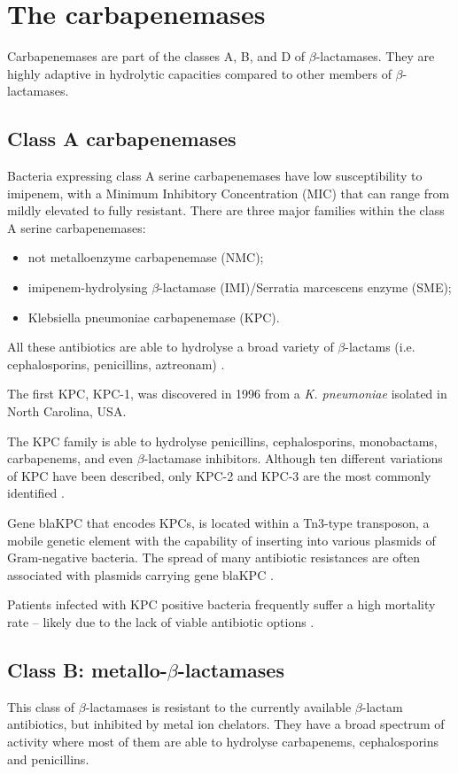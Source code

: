 \documentclass[11pt]{report}
\begin{document}
\section{The carbapenemases}
Carbapenemases are part of the classes A, B, and D of $\beta$-lactamases.
They are highly adaptive in hydrolytic capacities compared to other members of $\beta$-lactamases.

\subsection{Class A carbapenemases}
Bacteria expressing class A serine carbapenemases have low susceptibility to imipenem, with a Minimum Inhibitory Concentration (MIC) that can range from mildly elevated to fully resistant.
There are three major families within the class A serine carbapenemases:

\begin{itemize}
\item not metalloenzyme carbapenemase (NMC);
\item imipenem-hydrolysing $\beta$-lactamase (IMI)/Serratia marcescens enzyme (SME); 
\item Klebsiella pneumoniae carbapenemase (KPC).
\end{itemize}

All these antibiotics are able to hydrolyse a broad variety of $\beta$-lactams (i.e. cephalosporins, penicillins, aztreonam) \cite{kong2010beta} \cite{queenan2007}.

The first KPC, KPC-1, was discovered in 1996 from a \emph{K. pneumoniae} isolated in North Carolina, USA.

The KPC family is able to hydrolyse penicillins, cephalosporins, monobactams, carbapenems, and even $\beta$-lactamase inhibitors.
Although ten different variations of KPC have been described, only KPC-2 and KPC-3 are the most commonly identified \cite{waltherRasmussen2007} \cite{munozPrice2013}.

Gene blaKPC that encodes KPCs, is located within a Tn3-type transposon, a mobile genetic element with the capability of inserting into various plasmids of Gram-negative bacteria.
The spread of many antibiotic resistances are often associated with plasmids carrying gene blaKPC \cite{queenan2007}.

Patients infected with KPC positive bacteria frequently suffer a high mortality rate – likely due to the lack of viable antibiotic options \cite{munozPrice2013}.

\subsection {Class B: metallo-$\beta$-lactamases}
This class of $\beta$-lactamases is resistant to the currently available $\beta$-lactam antibiotics, but inhibited by metal ion chelators.
They have a broad spectrum of activity where most of them are able to hydrolyse carbapenems, cephalosporins and penicillins.
\end{document}
